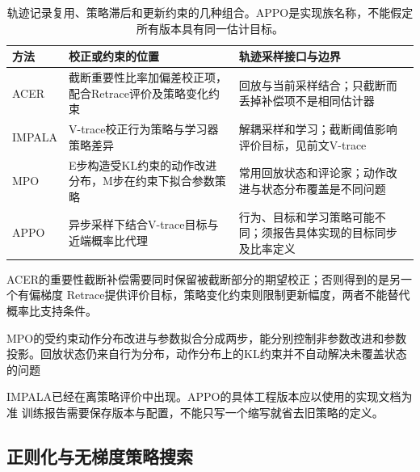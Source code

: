 \begin{table}[t]
  \centering
  \small
  \begin{tabularx}{\linewidth}{>{\raggedright\arraybackslash}p{17mm} >{\raggedright\arraybackslash}X >{\raggedright\arraybackslash}X}
    \toprule
    方法 & 校正或约束的位置 & 轨迹采样接口与边界 \\
    \midrule
    ACER & 截断重要性比率加偏差校正项，配合Retrace评价及策略变化约束 & 回放与当前采样结合；只截断而丢掉补偿项不是相同估计器 \\
    IMPALA & V-trace校正行为策略与学习器策略差异 & 解耦采样和学习；截断阈值影响评价目标，见前文V-trace \\
    MPO & E步构造受KL约束的动作改进分布，M步在约束下拟合参数策略 & 常用回放状态和评论家；动作改进与状态分布覆盖是不同问题 \\
    APPO & 异步采样下结合V-trace目标与近端概率比代理 & 行为、目标和学习策略可能不同；须报告具体实现的目标同步及比率定义 \\
    \bottomrule
  \end{tabularx}
  \caption{轨迹记录复用、策略滞后和更新约束的几种组合。APPO是实现族名称，不能假定所有版本具有同一估计目标。}
  \label{tab:rl-learning-off-policy-actors}
\end{table}

ACER的重要性截断补偿需要同时保留被截断部分的期望校正；否则得到的是另一个有偏梯度
Retrace提供评价目标，策略变化约束则限制更新幅度，两者不能替代概率比支持条件。

MPO的受约束动作分布改进与参数拟合分成两步，能分别控制非参数改进和参数投影。回放状态仍来自行为分布，动作分布上的KL约束并不自动解决未覆盖状态的问题

IMPALA已经在离策略评价中出现。APPO的具体工程版本应以使用的实现文档为准
训练报告需要保存版本与配置，不能只写一个缩写就省去旧策略的定义。

\subsection{正则化与无梯度策略搜索}
\label{sec:rl-learning-regularized-search}

